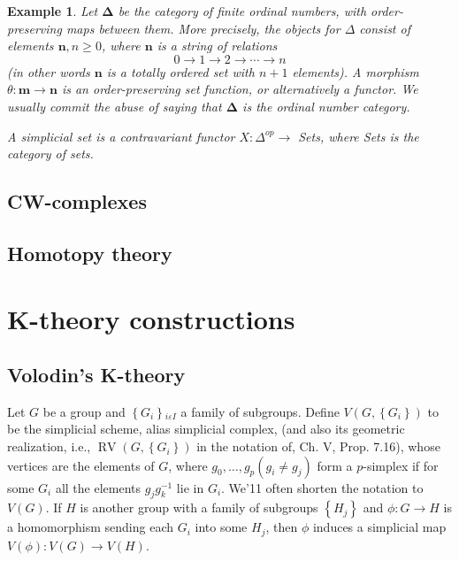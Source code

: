 \documentclass{report}
\newtheorem{example}{Example}
\begin{document}
\begin{example}
    Let $\boldsymbol{\Delta}$ be the category of finite ordinal numbers, with order-preserving maps between them. More precisely, the objects for $\Delta$ consist of elements $\mathbf{n}, n \geq 0$, where $\mathbf{n}$ is a string of relations
$$
0 \rightarrow 1 \rightarrow 2 \rightarrow \cdots \rightarrow n
$$
(in other words $\mathbf{n}$ is a totally ordered set with $n+1$ elements). A morphism $\theta: \mathbf{m} \rightarrow \mathbf{n}$ is an order-preserving set function, or alternatively a functor. We usually commit the abuse of saying that $\boldsymbol{\Delta}$ is the ordinal number category.

A simplicial set is a contravariant functor $X: \Delta^{o p} \rightarrow$ Sets, where Sets is the category of sets.
\end{example}



\section{CW-complexes}

\section{Homotopy theory}





\chapter{K-theory constructions} 
\section{Volodin's K-theory}

Let $G$ be a group and $\left\{G_i\right\}{ }_{i \varepsilon I}$ a family of subgroups. Define $V\left(G,\left\{G_i\right\}\right)$ to be the simplicial scheme, alias simplicial complex, (and also its geometric realization, i.e., $\operatorname{RV}\left(G,\left\{G_i\right\}\right)$ in the notation of, Ch. V, Prop. 7.16), whose vertices are the elements of $G$, where $g_0, \ldots, g_p\left(g_i \neq g_j\right)$ form a $p$-simplex if for some $G_i$ all the elements $g_j g_k^{-1}$ lie in $G_i$. We'11 often shorten the notation to $V(G)$. If $H$ is another group with a family of subgroups $\left\{H_j\right\}$ and $\phi: G \rightarrow H$ is a homomorphism sending each $G_i$ into some $H_j$, then $\phi$ induces a simplicial map $V(\phi): V(G) \rightarrow V(H)$.
\end{document}

